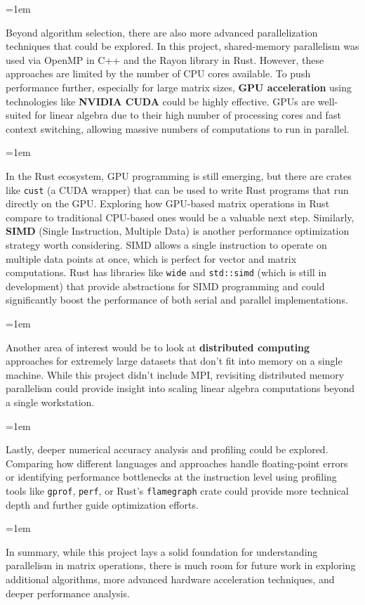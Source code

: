 \documentclass[12pt]{article}
\begin{document}
\parskip=1em

Beyond algorithm selection, there are also more advanced parallelization techniques that could be explored. In this project, shared-memory
parallelism was used via OpenMP in C++ and the Rayon library in Rust. However, these approaches are limited by the number of CPU cores available.
To push performance further, especially for large matrix sizes, \textbf{GPU acceleration} using technologies like \textbf{NVIDIA CUDA} could be
highly effective. GPUs are well-suited for linear algebra due to their high number of processing cores and fast context switching, allowing massive
numbers of computations to run in parallel.

\parskip=1em

In the Rust ecosystem, GPU programming is still emerging, but there are crates like \texttt{cust} (a CUDA wrapper) that can be used to write Rust
programs that run directly on the GPU. Exploring how GPU-based matrix operations in Rust compare to traditional CPU-based ones would be a valuable
next step. Similarly, \textbf{SIMD} (Single Instruction, Multiple Data) is another performance optimization strategy worth considering. SIMD allows
a single instruction to operate on multiple data points at once, which is perfect for vector and matrix computations. Rust has libraries like
\texttt{wide} and \texttt{std::simd} (which is still in development) that provide abstractions for SIMD programming and could significantly boost the
performance of both serial and parallel implementations.

\parskip=1em

Another area of interest would be to look at \textbf{distributed computing} approaches for extremely large datasets that don't fit into memory on a
single machine. While this project didn't include MPI, revisiting distributed memory parallelism could provide insight into scaling linear algebra computations beyond a single workstation.

\parskip=1em

Lastly, deeper numerical accuracy analysis and profiling could be explored. Comparing how different languages and approaches handle
floating-point errors or identifying performance bottlenecks at the instruction level using profiling tools like \texttt{gprof}, \texttt{perf}, or
Rust's \texttt{flamegraph} crate could provide more technical depth and further guide optimization efforts.

\parskip=1em

In summary, while this project lays a solid foundation for understanding parallelism in matrix operations, there is much room for future work in exploring
additional algorithms, more advanced hardware acceleration techniques, and deeper performance analysis.
\end{document}
